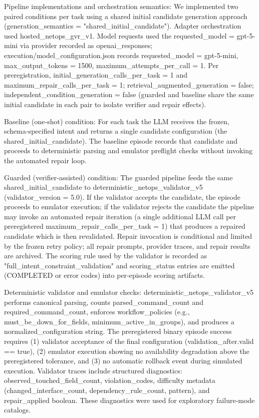 \documentclass[conference]{IEEEtran}
\begin{document}
Pipeline implementations and orchestration semantics: We implemented two paired conditions per task using a shared initial candidate generation approach (generation\_semantics = "shared\_initial\_candidate"). Adapter orchestration used hosted\_netops\_gvr\_v1. Model requests used the requested\_model = gpt-5-mini via provider recorded as openai\_responses; execution/model\_configuration.json records requested\_model = gpt-5-mini, max\_output\_tokens = 1500, maximum\_attempts\_per\_call = 1. Per preregistration, initial\_generation\_calls\_per\_task = 1 and maximum\_repair\_calls\_per\_task = 1; retrieval\_augmented\_generation = false; independent\_condition\_generation = false (guarded and baseline share the same initial candidate in each pair to isolate verifier and repair effects).

Baseline (one‑shot) condition: For each task the LLM receives the frozen, schema‑specified intent and returns a single candidate configuration (the shared\_initial\_candidate). The baseline episode records that candidate and proceeds to deterministic parsing and emulator preflight checks without invoking the automated repair loop.

Guarded (verifier‑assisted) condition: The guarded pipeline feeds the same shared\_initial\_candidate to deterministic\_netops\_validator\_v5 (validator\_version = 5.0). If the validator accepts the candidate, the episode proceeds to emulator execution; if the validator rejects the candidate the pipeline may invoke an automated repair iteration (a single additional LLM call per preregistered maximum\_repair\_calls\_per\_task = 1) that produces a repaired candidate which is then revalidated. Repair invocation is conditional and limited by the frozen retry policy; all repair prompts, provider traces, and repair results are archived. The scoring rule used by the validator is recorded as "full\_intent\_constraint\_validation" and scoring\_status entries are emitted (COMPLETED or error codes) into per‑episode scoring artifacts.

Deterministic validator and emulator checks: deterministic\_netops\_validator\_v5 performs canonical parsing, counts parsed\_command\_count and required\_command\_count, enforces workflow\_policies (e.g., must\_be\_down\_for\_fields, minimum\_active\_in\_groups), and produces a normalized\_configuration string. The preregistered binary episode success requires (1) validator acceptance of the final configuration (validation\_after.valid == true), (2) emulator execution showing no availability degradation above the preregistered tolerance, and (3) no automatic rollback event during simulated execution. Validator traces include structured diagnostics: observed\_touched\_field\_count, violation\_codes, difficulty metadata (changed\_interface\_count, dependency\_rule\_count, pattern), and repair\_applied boolean. These diagnostics were used for exploratory failure‑mode catalogs.
\end{document}
